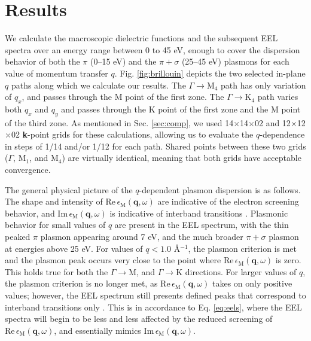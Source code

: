 \documentclass[aps,prb,10pt,showpacs,superscriptaddress,twocolumn,notitlepage]{revtex4-1}
\begin{document}

\section{Results}\label{sec:results}

We calculate the macroscopic dielectric functions and the subsequent EEL spectra
over an energy range between 0 to 45 eV, enough to cover the dispersion behavior
of both the $\pi$ (0--15 eV) and the $\pi + \sigma$ (25--45 eV) plasmons for
each value of momentum transfer $q$. Fig. \ref{fig:brillouin} depicts the two
selected in-plane $q$ paths along which we calculate our results. The $\Gamma
\rightarrow \mathrm{M}_{4}$ path has only variation of $q_{x}$, and passes
through the M point of the first zone. The $\Gamma \rightarrow \mathrm{K}_{4}$
path varies both $q_{x}$ and $q_{y}$ and passes through the K point of the first
zone and the M point of the third zone. As mentioned in Sec. \ref{sec:comp}, we
used 14$\times$14$\times$02 and 12$\times$12$\times$02 \textbf{k}-point grids
for these calculations, allowing us to evaluate the $q$-dependence in steps of
1/14 and/or 1/12 for each path. Shared points between these two grids ($\Gamma$,
M$_{1}$, and M$_{4}$) are virtually identical, meaning that both grids have
acceptable convergence.

The general physical picture of the $q$-dependent plasmon dispersion is as
follows. The shape and intensity of
$\mathrm{Re}\,\epsilon_{\mathrm{M}}(\mathbf{q}, \omega)$ are indicative of the
electron screening behavior, and $\mathrm{Im}\,\epsilon_{\mathrm{M}}(\mathbf{q},
\omega)$ is indicative of interband transitions \cite{marinopoulosPRB04}.
Plasmonic behavior for small values of $q$ are present in the EEL spectrum, with
the thin peaked $\pi$ plasmon appearing around 7 eV, and the much broader $\pi +
\sigma$ plasmon at energies above 25 eV. For values of $q < 1.0$ \r{A}$^{-1}$,
the plasmon criterion is met and the plasmon peak occurs very close to the point
where $\mathrm{Re}\,\epsilon_{\mathrm{M}}(\mathbf{q}, \omega)$ is zero. This
holds true for both the $\Gamma \rightarrow \mathrm{M}$, and $\Gamma
\rightarrow \mathrm{K}$ directions. For larger values of $q$, the plasmon
criterion is no longer met, as $\mathrm{Re}\,\epsilon_{\mathrm{M}}(\mathbf{q},
\omega)$ takes on only positive values; however, the EEL spectrum still presents
defined peaks that correspond to interband transitions only
\cite{marinopoulosPRB04}. This is in accordance to Eq. \ref{eq:eels}, where the
EEL spectra will begin to be less and less affected by the reduced screening of
$\mathrm{Re}\,\epsilon_{\mathrm{M}}(\mathbf{q}, \omega)$, and essentially mimics
$\mathrm{Im}\,\epsilon_{\mathrm{M}}(\mathbf{q}, \omega)$. 
\end{document}
